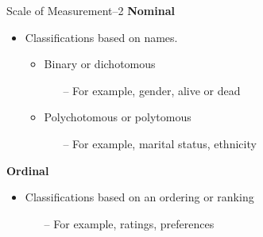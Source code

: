 \documentclass[10pt,dvipsnames, aspectratio=169]{beamer}
\begin{document}
\begin{frame}[t]{Scale of Measurement--2}
	\textbf{Nominal}
	\begin{itemize}
		\item Classifications based on names.
		\begin{itemize}
			\item Binary or dichotomous
			\begin{itemize}
				\item [--]For example, gender, alive or dead
			\end{itemize}
		\end{itemize}
		
		\begin{itemize}
			\item Polychotomous or polytomous
			\begin{itemize}
				\item[--] For example, marital status, ethnicity
			\end{itemize}
		\end{itemize}
	\end{itemize}
	
	\textbf{Ordinal}
	\begin{itemize}
		\item Classifications based on an ordering or ranking
		\begin{itemize}
			\item [--]For example, ratings, preferences
		\end{itemize}
	\end{itemize}
\end{frame}
\end{document}

